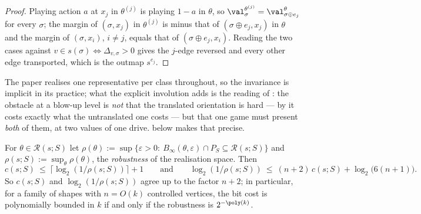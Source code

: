 \begin{proof}
Playing action $a$ at $x_j$ in $\theta^{(j)}$ is playing $1-a$ in $\theta$, so
$\val^{\theta^{(j)}}_\sigma=\val^{\theta}_{\sigma\oplus e_j}$ for every
$\sigma$; the margin of $(\sigma,x_j)$ in $\theta^{(j)}$ is minus that of
$(\sigma\oplus e_j,x_j)$ in $\theta$ and the margin of $(\sigma,x_i)$,
$i\ne j$, equals that of $(\sigma\oplus e_j,x_i)$. Reading the two cases
against $v\in s(\sigma)\iff \Delta_{v,\sigma}>0$ gives the $j$-edge reversed
and every other edge transported, which is the outmap $s^{e_j}$.
\end{proof}

\begin{remark}\label{rs:rem-swap}
The paper realises one representative per class throughout, so the invariance
is implicit in its practice; what the explicit involution adds is the reading
of : the obstacle at a blow-up level is \emph{not}
that the translated orientation is hard --- by  it costs
exactly what the untranslated one costs --- but that one game must present
\emph{both} of them, at two values of one drive.  below makes
that precise.
\end{remark}

\begin{theorem}\label{rs:inradius}
For $\theta\in\mathcal R(s;S)$ let
$\rho(\theta):=\sup\{\varepsilon>0:\ B_\infty(\theta,\varepsilon)\cap P_S
\subseteq\mathcal R(s;S)\}$ and $\rho(s;S):=\sup_\theta\rho(\theta)$, the
\emph{robustness} of the realisation space. Then
\[
  c(s;S)\ \le\ \bigl\lceil\log_2(1/\rho(s;S))\bigr\rceil+1
  \qquad\text{and}\qquad
  \log_2(1/\rho(s;S))\ \le\ (n+2)\,c(s;S)+\log_2\bigl(6(n+1)\bigr).
\]
So $c(s;S)$ and $\log_2(1/\rho(s;S))$ agree up to the factor $n+2$; in
particular, for a family of shapes with $n=O(k)$ controlled vertices, the bit
cost is polynomially bounded in $k$ if and only if the robustness is
$2^{-\poly(k)}$.
\end{theorem}

